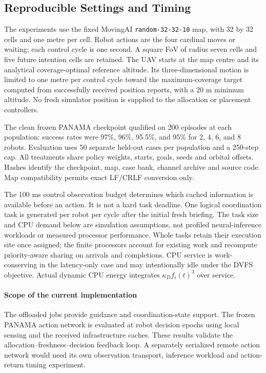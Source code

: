 \subsection{Reproducible Settings and Timing}
The experiments use the fixed MovingAI \texttt{random-32-32-10} map, with 32 by 32 cells and one metre per cell. Robot actions are the four cardinal moves or waiting; each control cycle is one second. A square FoV of radius seven cells and five future intention cells are retained. The UAV starts at the map centre and its analytical coverage-optimal reference altitude. Its three-dimensional motion is limited to one metre per control cycle toward the maximum-coverage target computed from successfully received position reports, with a 20 m minimum altitude. No fresh simulator position is supplied to the allocation or placement controllers.

The clean frozen PANAMA checkpoint qualified on 200 episodes at each population: success rates were 97\%, 96\%, 95.5\%, and 95\% for 2, 4, 6, and 8 robots. Evaluation uses 50 separate held-out cases per population and a 250-step cap. All treatments share policy weights, starts, goals, seeds and orbital offsets. Hashes identify the checkpoint, map, case bank, channel archive and source code. Map compatibility permits exact LF/CRLF conversion only.

The 100 ms control observation budget determines which cached information is available before an action. It is not a hard task deadline. One logical coordination task is generated per robot per cycle after the initial fresh briefing. The task size and CPU demand below are simulation assumptions, not profiled neural-inference workloads or measured processor performance. Whole tasks retain their execution site once assigned; the finite processors account for existing work and recompute priority-aware sharing on arrivals and completions. CPU service is work-conserving in the latency-only case and may intentionally idle under the DVFS objective. Actual dynamic CPU energy integrates $\kappa_D f_i(t)^3$ over service.
\paragraph{Scope of the current implementation}
The offloaded jobs provide guidance and coordination-state support. The frozen PANAMA action network is evaluated at robot decision epochs using local sensing and the received infrastructure caches. These results validate the allocation--freshness--decision feedback loop. A separately serialized remote action network would need its own observation transport, inference workload and action-return timing experiment.

